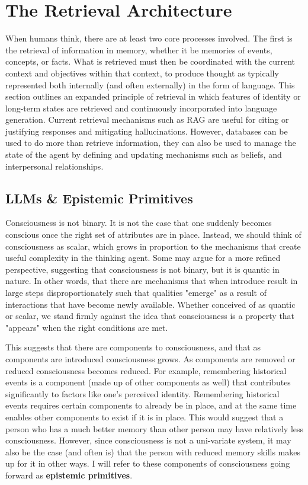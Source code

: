 \section{The Retrieval Architecture}
When humans think, there are at least two core processes involved. The first is the retrieval of information in memory, whether it be memories of events, concepts, or facts. What is retrieved must then be coordinated with the current context and objectives within that context, to produce thought as typically represented both internally (and often externally) in the form of language. This section outlines an expanded principle of retrieval in which features of identity or long-term states are retrieved and continuously incorporated into language generation. Current retrieval mechanisms such as RAG are useful for citing or justifying responses and mitigating hallucinations. However, databases can be used to do more than retrieve information, they can also be used to manage the state of the agent by defining and updating mechanisms such as beliefs, and interpersonal relationships.

\subsection{LLMs & Epistemic Primitives}
Consciousness is not binary. It is not the case that one suddenly becomes conscious once the right set of attributes are in place. Instead, we should think of consciousness as scalar, which grows in proportion to the mechanisms that create useful complexity in the thinking agent. Some may argue for a more refined perspective, suggesting that consciousness is not binary, but it is quantic in nature. In other words, that there are mechanisms that when introduce result in large steps disproportionately such that qualities "emerge" as a result of interactions that have become newly available. Whether conceived of as quantic or scalar, we stand firmly against the idea that consciousness is a property that "appears" when the right conditions are met.

This suggests that there are components to consciousness, and that as components are introduced consciousness grows. As components are removed or reduced consciousness becomes reduced. For example, remembering historical events is a component (made up of other components as well) that contributes significantly to factors like one's perceived identity. Remembering historical events requires certain components to already be in place, and at the same time enables other components to exist if it is in place. This would suggest that a person who has a much better memory than other person may have relatively less consciousness. However, since consciousness is not a uni-variate system, it may also be the case (and often is) that the person with reduced memory skills makes up for it in other ways. I will refer to these components of consciousness going forward as \textbf{epistemic primitives}.

